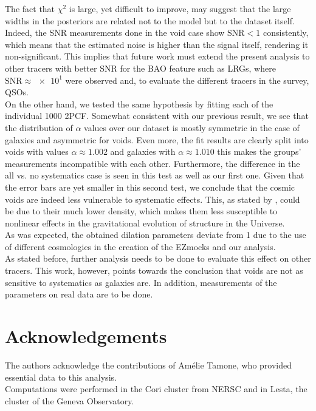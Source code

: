 \documentclass[fleqn, usenatbib]{mnras}
\begin{document}
The fact that $\chi^2$ is large, yet difficult to improve, may suggest that the large widths in the posteriors are related not to the model but to the dataset itself. Indeed, the SNR measurements done in the void case show $\mathrm{SNR}<1$ consistently, which means that the estimated noise is higher than the signal itself, rendering it non-significant. This implies that future work must extend the present analysis to other tracers with better SNR for the BAO feature such as LRGs, where $\mathrm{SNR}\approx\num{e1}$ were observed \citep[see][]{Liang2016} and, to evaluate the different tracers in the survey, QSOs.\\
On the other hand, we tested the same hypothesis by fitting each of the individual 1000 2PCF. Somewhat consistent with our previous result, we see that the distribution of $\alpha$ values over our dataset is mostly symmetric in the case of galaxies and asymmetric for voids. Even more, the fit results are clearly split into voids with values $\alpha\approx1.002$ and galaxies with $\alpha\approx1.010$ this makes the groups' measurements incompatible with each other. Furthermore, the difference in the all vs. no systematics case is seen in this test as well as our first one. Given that the error bars are yet smaller in this second test, we conclude that the cosmic voids are indeed less vulnerable to systematic effects. This, as stated by \citet{Zhao2019}, could be due to their much lower density, which makes them less susceptible to nonlinear effects in the gravitational evolution of structure in the Universe.\\
As was expected, the obtained dilation parameters deviate from 1 due to the use of different cosmologies in the creation of the EZmocks and our analysis.\\
As stated before, further analysis needs to be done to evaluate this effect on other tracers. This work, however, points towards the conclusion that voids are not as sensitive to systematics as galaxies are. In addition, measurements of the parameters on real data are to be done.

\section*{Acknowledgements}
The authors acknowledge the contributions of Am\'elie Tamone, who provided essential data to this analysis.\\
Computations were performed in the Cori cluster from NERSC and in Lesta, the cluster of the Geneva Observatory.
\end{document}
